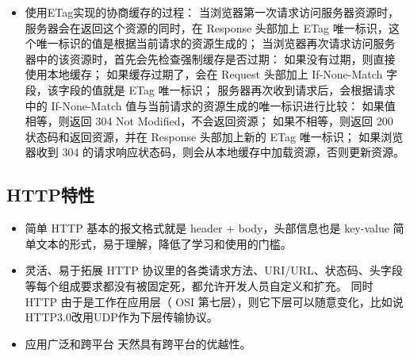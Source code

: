 \documentclass[11pt]{article}
\begin{document}
\begin{itemize}
\begin{itemize}
\item 使用ETag实现的协商缓存的过程：
当浏览器第一次请求访问服务器资源时，服务器会在返回这个资源的同时，在 Response 头部加上 ETag 唯一标识，这个唯一标识的值是根据当前请求的资源生成的；
当浏览器再次请求访问服务器中的该资源时，首先会先检查强制缓存是否过期：
  如果没有过期，则直接使用本地缓存；
  如果缓存过期了，会在 Request 头部加上 If-None-Match 字段，该字段的值就是 ETag 唯一标识；
服务器再次收到请求后，会根据请求中的 If-None-Match 值与当前请求的资源生成的唯一标识进行比较：
  如果值相等，则返回 304 Not Modified，不会返回资源；
  如果不相等，则返回 200 状态码和返回资源，并在 Response 头部加上新的 ETag 唯一标识；
如果浏览器收到 304 的请求响应状态码，则会从本地缓存中加载资源，否则更新资源。
\end{itemize}
\end{itemize}
\subsection{HTTP特性}
\label{sec:org5b566bc}
\begin{itemize}
\item 简单
HTTP 基本的报文格式就是 header + body，头部信息也是 key-value 简单文本的形式，易于理解，降低了学习和使用的门槛。
\item 灵活、易于拓展
HTTP 协议里的各类请求方法、URI/URL、状态码、头字段等每个组成要求都没有被固定死，都允许开发人员自定义和扩充。
同时 HTTP 由于是工作在应用层（ OSI 第七层），则它下层可以随意变化，比如说\- HTTP3.0改用UDP作为下层传输协议。
\item 应用广泛和跨平台
天然具有跨平台的优越性。
\end{itemize}
\end{document}
